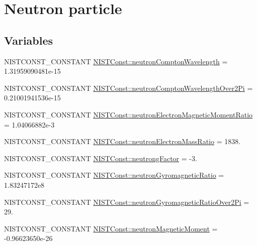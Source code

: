 \hypertarget{group___n_i_s_t_const-_neutron}{}\section{Neutron particle}
\label{group___n_i_s_t_const-_neutron}
\subsection*{Variables}
\begin{DoxyCompactItemize}
\item 
N\+I\+S\+T\+C\+O\+N\+S\+T\+\_\+\+C\+O\+N\+S\+T\+A\+NT \mbox{\hyperlink{group___n_i_s_t_const-_neutron_gae051f50a8d39fb52c5ce761f9b0696ae}{N\+I\+S\+T\+Const\+::neutron\+Compton\+Wavelength}} = 1.\+31959090481e-\/15
\item 
N\+I\+S\+T\+C\+O\+N\+S\+T\+\_\+\+C\+O\+N\+S\+T\+A\+NT \mbox{\hyperlink{group___n_i_s_t_const-_neutron_gadf551a9e4c9f1c8b81a0b0ffc854d02f}{N\+I\+S\+T\+Const\+::neutron\+Compton\+Wavelength\+Over2\+Pi}} = 0.\+21001941536e-\/15
\item 
N\+I\+S\+T\+C\+O\+N\+S\+T\+\_\+\+C\+O\+N\+S\+T\+A\+NT \mbox{\hyperlink{group___n_i_s_t_const-_neutron_ga18e39275d61e889aada6523c0faedb28}{N\+I\+S\+T\+Const\+::neutron\+Electron\+Magnetic\+Moment\+Ratio}} = 1.\+04066882e-\/3
\item 
N\+I\+S\+T\+C\+O\+N\+S\+T\+\_\+\+C\+O\+N\+S\+T\+A\+NT \mbox{\hyperlink{group___n_i_s_t_const-_neutron_gaed8ff3598a8de7256064056501b72e97}{N\+I\+S\+T\+Const\+::neutron\+Electron\+Mass\+Ratio}} = 1838.
\item 
N\+I\+S\+T\+C\+O\+N\+S\+T\+\_\+\+C\+O\+N\+S\+T\+A\+NT \mbox{\hyperlink{group___n_i_s_t_const-_neutron_ga6391993dd3564c84df74dd3e9e245f4b}{N\+I\+S\+T\+Const\+::neutrong\+Factor}} = -\/3.
\item 
N\+I\+S\+T\+C\+O\+N\+S\+T\+\_\+\+C\+O\+N\+S\+T\+A\+NT \mbox{\hyperlink{group___n_i_s_t_const-_neutron_gae41519ad6817ec697afb92b914ad0b14}{N\+I\+S\+T\+Const\+::neutron\+Gyromagnetic\+Ratio}} = 1.\+83247172e8
\item 
N\+I\+S\+T\+C\+O\+N\+S\+T\+\_\+\+C\+O\+N\+S\+T\+A\+NT \mbox{\hyperlink{group___n_i_s_t_const-_neutron_gaadb23cc5d8146b6a47bcfe0798e51674}{N\+I\+S\+T\+Const\+::neutron\+Gyromagnetic\+Ratio\+Over2\+Pi}} = 29.
\item 
N\+I\+S\+T\+C\+O\+N\+S\+T\+\_\+\+C\+O\+N\+S\+T\+A\+NT \mbox{\hyperlink{group___n_i_s_t_const-_neutron_gab5d1be65ba0e6d7851bad31495663148}{N\+I\+S\+T\+Const\+::neutron\+Magnetic\+Moment}} = -\/0.\+96623650e-\/26

\end{DoxyCompactItemize}
